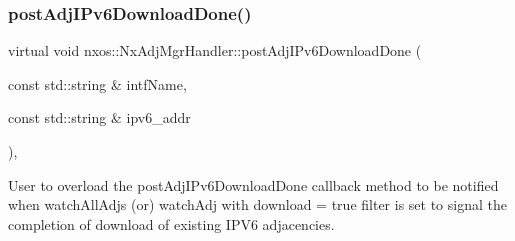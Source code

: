 \subsubsection{\texorpdfstring{post\+Adj\+I\+Pv6\+Download\+Done()}{postAdjIPv6DownloadDone()}}
{\footnotesize\ttfamily virtual void nxos\+::\+Nx\+Adj\+Mgr\+Handler\+::post\+Adj\+I\+Pv6\+Download\+Done (\begin{DoxyParamCaption}\item[{const std\+::string \&}]{intf\+Name,  }\item[{const std\+::string \&}]{ipv6\+\_\+addr }\end{DoxyParamCaption})\hspace{0.3cm}{\ttfamily [inline]}, {\ttfamily [virtual]}}

User to overload the post\+Adj\+I\+Pv6\+Download\+Done callback method to be notified when watch\+All\+Adjs (or) watch\+Adj with download = true filter is set to signal the completion of download of existing I\+P\+V6 adjacencies. 
